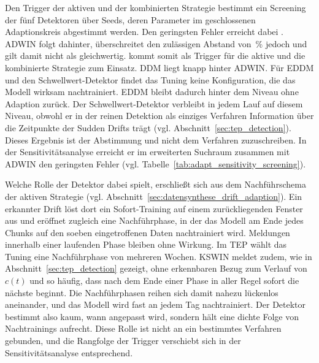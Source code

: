 %
Den Trigger der aktiven und der kombinierten Strategie bestimmt ein Screening der fünf Detektoren über \tepadaptNScreenSeeds{} Seeds, deren Parameter im geschlossenen Adaptionskreis abgestimmt werden. Den geringsten Fehler erreicht dabei \tepadaptScreenLead. \ac{ADWIN} folgt dahinter, überschreitet den zulässigen Abstand von \tepadaptTieMaxRel\,\% jedoch und gilt damit nicht als gleichwertig. \tepadaptDetector{} kommt somit als Trigger für die aktive und die kombinierte Strategie zum Einsatz. \ac{DDM} liegt knapp hinter \ac{ADWIN}. Für \ac{EDDM} und den Schwellwert-Detektor findet das Tuning keine Konfiguration, die das Modell wirksam nachtrainiert. \ac{EDDM} bleibt dadurch hinter dem Niveau ohne Adaption zurück. Der Schwellwert-Detektor verbleibt in jedem Lauf auf diesem Niveau, obwohl er in der reinen Detektion als einziges Verfahren Information über die Zeitpunkte der Sudden Drifts trägt (vgl. Abschnitt~\ref{sec:tep_detection}). Dieses Ergebnis ist der Abstimmung und nicht dem Verfahren zuzuschreiben. In der Sensitivitätsanalyse erreicht er im erweiterten Suchraum zusammen mit \ac{ADWIN} den geringsten Fehler (vgl. Tabelle~\ref{tab:adapt_sensitivity_screening}). \par
%
Welche Rolle der Detektor dabei spielt, erschließt sich aus dem Nachführschema der aktiven Strategie (vgl. Abschnitt~\ref{sec:datensynthese_drift_adaption}). Ein erkannter Drift löst dort ein Sofort-Training auf einem zurückliegenden Fenster aus und eröffnet zugleich eine Nachführphase, in der das Modell am Ende jedes Chunks auf den soeben eingetroffenen Daten nachtrainiert wird. Meldungen innerhalb einer laufenden Phase bleiben ohne Wirkung. Im \ac{TEP} wählt das Tuning eine Nachführphase von mehreren Wochen. \ac{KSWIN} meldet zudem, wie in Abschnitt~\ref{sec:tep_detection} gezeigt, ohne erkennbaren Bezug zum Verlauf von $c(t)$ und so häufig, dass nach dem Ende einer Phase in aller Regel sofort die nächste beginnt. Die Nachführphasen reihen sich damit nahezu lückenlos aneinander, und das Modell wird fast an jedem Tag nachtrainiert. Der Detektor bestimmt also kaum, wann angepasst wird, sondern hält eine dichte Folge von Nachtrainings aufrecht. Diese Rolle ist nicht an ein bestimmtes Verfahren gebunden, und die Rangfolge der Trigger verschiebt sich in der Sensitivitätsanalyse entsprechend. \par
%
